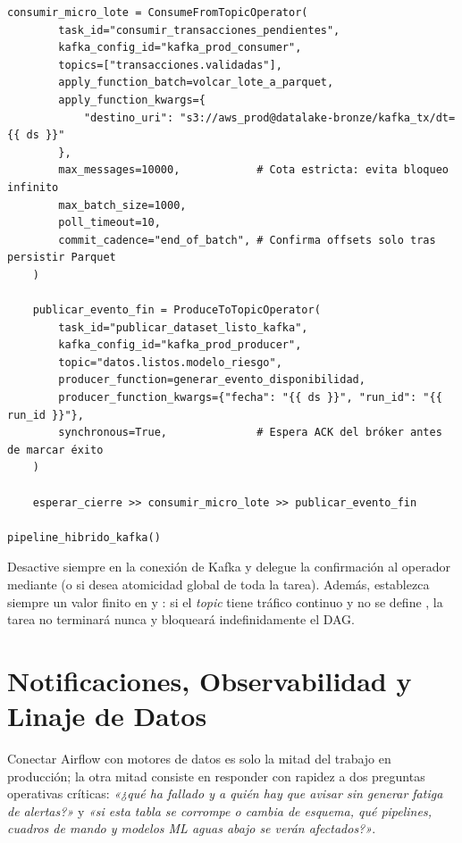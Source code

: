 \begin{lstlisting}[style=python, caption={Pipeline híbrido Kafka <-> Airflow con sensor deferrable, consumo acotado a Parquet y publicación de eventos.}, label={lst:kafka-pipeline-hibrido}]
    consumir_micro_lote = ConsumeFromTopicOperator(
        task_id="consumir_transacciones_pendientes",
        kafka_config_id="kafka_prod_consumer",
        topics=["transacciones.validadas"],
        apply_function_batch=volcar_lote_a_parquet,
        apply_function_kwargs={
            "destino_uri": "s3://aws_prod@datalake-bronze/kafka_tx/dt={{ ds }}"
        },
        max_messages=10000,            # Cota estricta: evita bloqueo infinito
        max_batch_size=1000,
        poll_timeout=10,
        commit_cadence="end_of_batch", # Confirma offsets solo tras persistir Parquet
    )

    publicar_evento_fin = ProduceToTopicOperator(
        task_id="publicar_dataset_listo_kafka",
        kafka_config_id="kafka_prod_producer",
        topic="datos.listos.modelo_riesgo",
        producer_function=generar_evento_disponibilidad,
        producer_function_kwargs={"fecha": "{{ ds }}", "run_id": "{{ run_id }}"},
        synchronous=True,              # Espera ACK del bróker antes de marcar éxito
    )

    esperar_cierre >> consumir_micro_lote >> publicar_evento_fin

pipeline_hibrido_kafka()
\end{lstlisting}

\begin{warningbox}
Desactive siempre  en la conexión de Kafka y delegue la confirmación al operador mediante  (o  si desea atomicidad global de toda la tarea). Además, establezca siempre un valor finito en  y : si el \textit{topic} tiene tráfico continuo y no se define , la tarea no terminará nunca y bloqueará indefinidamente el DAG.
\end{warningbox}

\section{Notificaciones, Observabilidad y Linaje de Datos}\label{sec:conectores-observabilidad-linaje}

Conectar Airflow con motores de datos es solo la mitad del trabajo en producción; la otra mitad consiste en responder con rapidez a dos preguntas operativas críticas: \textit{«¿qué ha fallado y a quién hay que avisar sin generar fatiga de alertas?»} y \textit{«si esta tabla se corrompe o cambia de esquema, qué pipelines, cuadros de mando y modelos ML aguas abajo se verán afectados?»}.

